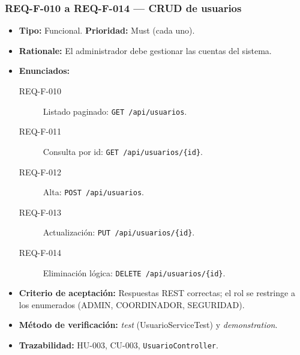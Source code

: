 \documentclass[12pt,a4paper]{article}
\begin{document}
\subsubsection{REQ-F-010 a REQ-F-014 — CRUD de usuarios}
\begin{itemize}
  \item \textbf{Tipo:} Funcional. \textbf{Prioridad:} Must (cada uno).
  \item \textbf{Rationale:} El administrador debe gestionar las cuentas del sistema.
  \item \textbf{Enunciados:}
    \begin{description}
      \item[REQ-F-010] Listado paginado: \texttt{GET /api/usuarios}.
      \item[REQ-F-011] Consulta por id: \texttt{GET /api/usuarios/\{id\}}.
      \item[REQ-F-012] Alta: \texttt{POST /api/usuarios}.
      \item[REQ-F-013] Actualización: \texttt{PUT /api/usuarios/\{id\}}.
      \item[REQ-F-014] Eliminación lógica: \texttt{DELETE /api/usuarios/\{id\}}.
    \end{description}
  \item \textbf{Criterio de aceptación:} Respuestas REST correctas; el rol se restringe a los
  enumerados (ADMIN, COORDINADOR, SEGURIDAD).
  \item \textbf{Método de verificación:} \textit{test} (UsuarioServiceTest) y
  \textit{demonstration}.
  \item \textbf{Trazabilidad:} HU-003, CU-003, \texttt{UsuarioController}.
\end{itemize}

\end{document}
